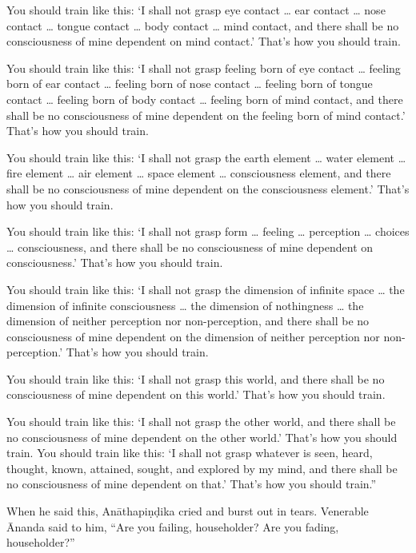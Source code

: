 \documentclass[12pt,openany]{book}%
\begin{document}
You should train like this: ‘I shall not grasp eye contact … ear contact … nose contact … tongue contact … body contact … mind contact, and there shall be no consciousness of mine dependent on mind contact.’ That’s how you should train. 

You should train like this: ‘I shall not grasp feeling born of eye contact … feeling born of ear contact … feeling born of nose contact … feeling born of tongue contact … feeling born of body contact … feeling born of mind contact, and there shall be no consciousness of mine dependent on the feeling born of mind contact.’ That’s how you should train. 

You should train like this: ‘I shall not grasp the earth element … water element … fire element … air element … space element … consciousness element, and there shall be no consciousness of mine dependent on the consciousness element.’ That’s how you should train. 

You should train like this: ‘I shall not grasp form … feeling … perception … choices … consciousness, and there shall be no consciousness of mine dependent on consciousness.’ That’s how you should train. 

You should train like this: ‘I shall not grasp the dimension of infinite space … the dimension of infinite consciousness … the dimension of nothingness … the dimension of neither perception nor non-perception, and there shall be no consciousness of mine dependent on the dimension of neither perception nor non-perception.’ That’s how you should train. 

You should train like this: ‘I shall not grasp this world, and there shall be no consciousness of mine dependent on this world.’ That’s how you should train. 

You should train like this: ‘I shall not grasp the other world, and there shall be no consciousness of mine dependent on the other world.’ That’s how you should train. You should train like this: ‘I shall not grasp whatever is seen, heard, thought, known, attained, sought, and explored by my mind, and there shall be no consciousness of mine dependent on that.’ That’s how you should train.” 

When he said this, \textsanskrit{Anāthapiṇḍika} cried and burst out in tears. Venerable Ānanda said to him, “Are you failing, householder? Are you fading, householder?” 
\end{document}
